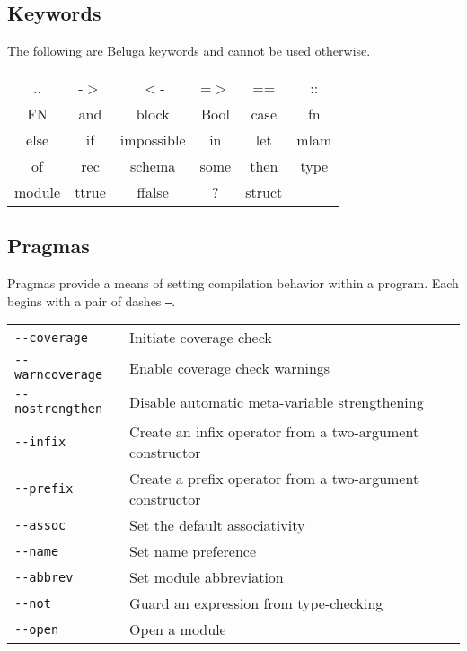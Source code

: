 \documentclass[11pt]{article}
\begin{document}

\subsection{Keywords}
The following are Beluga keywords and cannot be used otherwise. 
\begin{center}
\renewcommand{\arraystretch}{2}
\begin{tabular}{ c c c c c c }
.. & -$>$ & $<$-  & =$>$ &  ==  & :: \\
FN & and & block & Bool & case & fn \\
else & if & impossible & in & let & mlam \\
of & rec & schema & some & then & type \\
module & ttrue & ffalse & ? & struct &  \\
\end{tabular}
\end{center}

\subsection{Pragmas}
Pragmas provide a means of setting compilation behavior within a program. Each begins with a pair of dashes \texttt{--}. \\

\begin{tabular}{ | l l}
\texttt{-{}-coverage} & Initiate coverage check \\
\texttt{-{}-warncoverage} & Enable coverage check warnings \\
\texttt{-{}-nostrengthen} & Disable automatic meta-variable strengthening \\
\texttt{-{}-infix} & Create an infix operator from a two-argument constructor \\
\texttt{-{}-prefix} & Create a prefix operator from a two-argument constructor \\
\texttt{-{}-assoc} & Set the default associativity \\
\texttt{-{}-name} & Set name preference \\
\texttt{-{}-abbrev} & Set module abbreviation \\
\texttt{-{}-not} & Guard an expression from type-checking\\
\texttt{-{}-open} & Open a module\\
\end{tabular}
\end{document}
